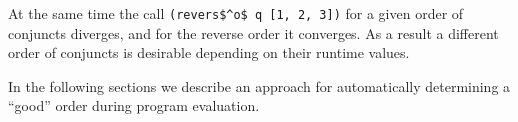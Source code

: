 
At the same time the call \lstinline{(revers$^o$ q [1, 2, 3])} for a given order of conjuncts diverges, and for the reverse order it converges. As a result a
different order of conjuncts is desirable depending on their runtime values.

In the following sections we describe an approach for automatically determining a ``good'' order during program evaluation.
